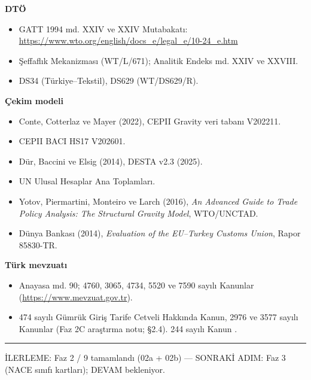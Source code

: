 \textbf{DTÖ}

\begin{itemize}
\tightlist
\item
  GATT 1994 md. XXIV ve XXIV Mutabakatı: \url{https://www.wto.org/english/docs_e/legal_e/10-24_e.htm}
\item
  Şeffaflık Mekanizması (WT/L/671); Analitik Endeks md. XXIV ve XXVIII.
\item
  DS34 (Türkiye--Tekstil), DS629 (WT/DS629/R).
\end{itemize}

\textbf{Çekim modeli}

\begin{itemize}
\tightlist
\item
  Conte, Cotterlaz ve Mayer (2022), CEPII Gravity veri tabanı V202211.
\item
  CEPII BACI HS17 V202601.
\item
  Dür, Baccini ve Elsig (2014), DESTA v2.3 (2025).
\item
  UN Ulusal Hesaplar Ana Toplamları.
\item
  Yotov, Piermartini, Monteiro ve Larch (2016), \emph{An Advanced Guide to Trade Policy Analysis: The Structural Gravity Model}, WTO/UNCTAD.
\item
  Dünya Bankası (2014), \emph{Evaluation of the EU--Turkey Customs Union}, Rapor 85830-TR.
\end{itemize}

\textbf{Türk mevzuatı}

\begin{itemize}
\tightlist
\item
  Anayasa md. 90; 4760, 3065, 4734, 5520 ve 7590 sayılı Kanunlar (\url{https://www.mevzuat.gov.tr}).
\item
  474 sayılı Gümrük Giriş Tarife Cetveli Hakkında Kanun, 2976 ve 3577 sayılı Kanunlar \etiketV{} (Faz 2C araştırma notu;  §2.4). 244 sayılı Kanun \etiketD{}.
\end{itemize}

\begin{center}\rule{0.5\linewidth}{0.5pt}\end{center}

\begin{gbilerleme}

İLERLEME: Faz 2 / 9 tamamlandı (02a + 02b) --- SONRAKİ ADIM: Faz 3 (NACE sınıfı kartları); DEVAM bekleniyor.

\end{gbilerleme}
